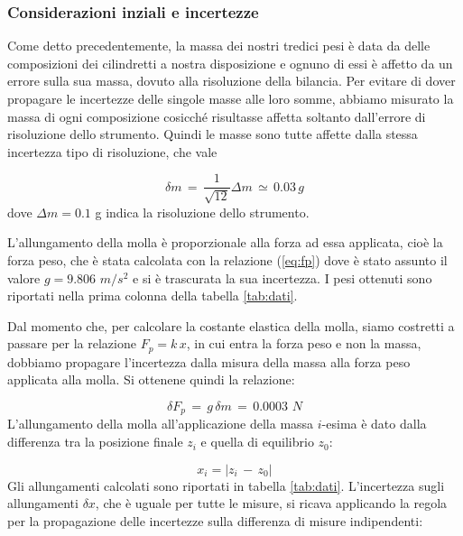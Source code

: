 \subsubsection{Considerazioni inziali e incertezze}
\label{incertezze}

Come detto precedentemente, la massa dei nostri tredici pesi è data da delle composizioni dei cilindretti a nostra disposizione e ognuno di essi è affetto da un errore sulla sua massa, dovuto alla risoluzione della bilancia. Per evitare di dover propagare le incertezze delle singole masse alle loro somme, abbiamo misurato la massa di ogni composizione cosicché risultasse affetta soltanto dall'errore di risoluzione dello strumento. Quindi le masse sono tutte affette dalla stessa incertezza tipo di risoluzione, che vale

\begin{equation*}
	\delta m \,=\, \frac{1}{\sqrt{12}}\Delta m \,\simeq\, 0.03 \,g 
\end{equation*}
%
dove $\Delta m = 0.1$ g indica la risoluzione dello strumento.

L'allungamento della molla è proporzionale alla forza ad essa applicata, cioè la forza peso, che è stata calcolata con la relazione (\ref{eq:fp})
dove è stato assunto il valore $g = 9.806 \,\, m/s^2$ e si è trascurata la sua incertezza. I pesi ottenuti sono riportati nella
prima colonna della tabella \ref{tab:dati}.

Dal momento che, per calcolare la costante elastica della molla, siamo costretti a passare per la relazione $F_p = k\,x$, in cui entra la forza peso e non la massa, dobbiamo propagare l'incertezza dalla misura della massa alla forza peso applicata alla molla. Si ottenene quindi la relazione:

\begin{equation*}
	\delta F_{p}\, =\, g\,\delta m \,=\, 0.0003 \,\, N 
\end{equation*}
%
L'allungamento della molla all'applicazione della massa $i$-esima è dato dalla differenza tra la posizione finale $z_i$ e quella di equilibrio $z_0$:

\begin{equation*}
	x_i = |z_i\,-\,z_0|
\end{equation*}
%
Gli allungamenti calcolati sono riportati in tabella \ref{tab:dati}. L’incertezza sugli allungamenti $\delta x$, che è uguale per tutte le misure, si ricava applicando la regola per la propagazione delle incertezze sulla differenza di misure indipendenti:

